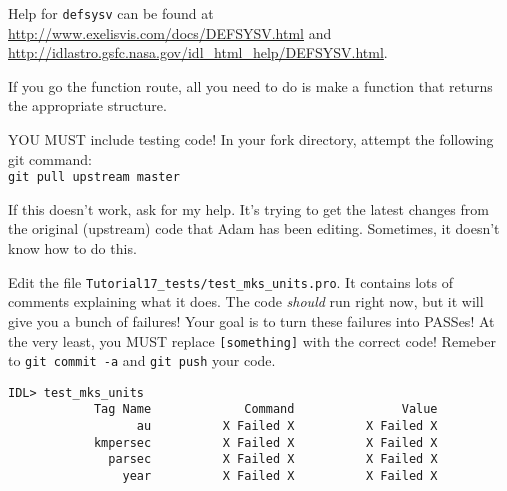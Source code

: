 \documentclass{article}
\begin{document}
\begin{spacing}{1.0}
Help for \verb|defsysv| can be found at
\url{http://www.exelisvis.com/docs/DEFSYSV.html} and
\url{http://idlastro.gsfc.nasa.gov/idl_html_help/DEFSYSV.html}.

If you go the function route, all you need to do is make a function that
returns the appropriate structure.

YOU MUST include testing code!  
In your fork directory, attempt the following git command:\\
\verb|git pull upstream master|

If this doesn't work, ask for my help.  It's trying to get the latest changes
from the original (upstream) code that Adam has been editing.  Sometimes, it
doesn't know how to do this.

Edit the file \verb|Tutorial17_tests/test_mks_units.pro|.  It contains lots of
comments explaining what it does.  The code \emph{should} run right now, but it
will give you a bunch of failures!  Your goal is to turn these failures into
PASSes!  At the very least, you MUST replace \verb|[something]| with the correct
code!  Remeber to \verb|git commit -a| and \verb|git push| your code.

\begin{lstlisting}
IDL> test_mks_units                                                             
            Tag Name             Command               Value
                  au          X Failed X          X Failed X
            kmpersec          X Failed X          X Failed X
              parsec          X Failed X          X Failed X
                year          X Failed X          X Failed X
\end{lstlisting}


\end{spacing}
\end{document}
